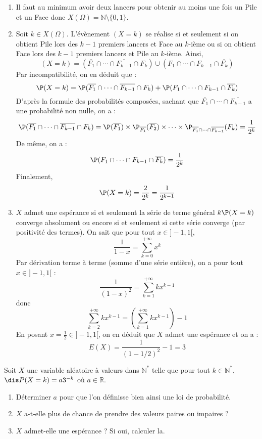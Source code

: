 \documentclass[a4paper,10pt]{report}
\begin{document}
\begin{enumerate}
\item Il faut au minimum avoir deux lancers pour obtenir au moins une fois un Pile et un Face donc $X(\Omega)= \mathbb{N} \setminus \lbrace 0,1 \rbrace$.
\item Soit $k \in X(\Omega)$. L'évènement $(X=k)$ se réalise si et seulement si on obtient Pile lors des $k-1$ premiers lancers et Face au $k$-ième ou si on obtient Face lors des $k-1$ premiers lancers et Pile au $k$-ième. Ainsi,
$$ (X=k) = (\overline{F_1} \cap \cdots \cap \overline{F_{k-1}} \cap F_k) \cup      (F_1 \cap \cdots \cap F_{k-1} \cap \overline{F_k} )$$
Par incompatibilité, on en déduit que :
$$ \P(X=k) = \P(\overline{F_1} \cap \cdots \cap \overline{F_{k-1}} \cap F_k) +     \P(F_1 \cap \cdots \cap F_{k-1} \cap \overline{F_k} )$$
D'après la formule des probabilités composées, sachant que $\overline{F_1} \cap \cdots \cap \overline{F_{k-1}}$ a une probabilité non nulle, on a :
$$ \P(\overline{F_1} \cap \cdots \cap \overline{F_{k-1}} \cap F_k) = \P(\overline{F_1}) \times \P_{\overline{F_1}}(\overline{F_2}) \times \cdots \times \P_{\overline{F_1} \cap \cdots \cap \overline{F_{k-1}}}(F_k) = \dfrac{1}{2^k}$$
De même, on a :
$$ \P(F_1 \cap \cdots \cap F_{k-1} \cap \overline{F_k} ) = \dfrac{1}{2^k}$$
Finalement,
$$ \P(X=k) = \dfrac{2}{2^k} = \dfrac{1}{2^{k-1}}$$
\item $X$ admet une espérance si et seulement la série de terme général $k\P(X=k)$ converge absolument ou encore si et seulement si cette série converge (par positivité des termes). On sait que pour tout $x \in ]-1,1[$,
$$ \dfrac{1}{1-x} = \sum_{k=0}^{+ \infty} x^k$$
Par dérivation terme à terme (somme d'une série entière), on a pour tout $x \in ]-1,1[$ :
$$ \dfrac{1}{(1-x)^2} = \sum_{k=1}^{+ \infty} k x^{k-1}$$
donc
$$ \sum_{k=2}^{+ \infty} k x^{k-1} = \left(\sum_{k=1}^{+ \infty} k x^{k-1}\right) -1$$
En posant $x= \tfrac{1}{2} \in ]-1,1[$, on en déduit que $X$ admet une espérance et on a :
$$ E(X) = \dfrac{1}{(1- 1/2)^2} -1= 3$$
\end{enumerate}

\begin{Exercice}{}
 Soit $X$ une variable aléatoire à valeurs dans $\mathbb{N}^*$ telle que pour tout $k \in \mathbb{N}^*$, $\dis P(X=k)=a3^{-k}$ où $a \in \mathbb{R}$.
\begin{enumerate}
\item Déterminer $a$ pour que l'on définisse bien ainsi une loi de probabilité.
\item $X$ a-t-elle plus de chance de prendre des valeurs paires ou impaires ?
\item $X$ admet-elle une espérance ? Si oui, calculer la.
\end{enumerate}
\end{Exercice}
\end{document}
